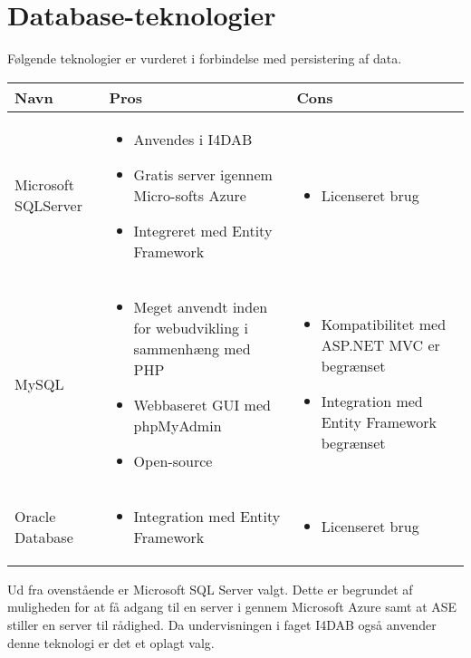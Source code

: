 \section{Database-teknologier}

Følgende teknologier er vurderet i forbindelse med persistering af data.

\begin{savenotes}
\begin{tabular}{|p{3cm}|p{5.5cm}|p{5.5cm}|}
\hline 
\textbf{Navn} & \textbf{Pros} & \textbf{Cons} \\ 
\hline

Microsoft SQL\newline Server
	&
	\begin{itemize}
		\item Anvendes i I4DAB
		\item Gratis server igennem Micro-softs Azure \citep{msazureWeb}
		\item Integreret med Entity Framework
	\end{itemize}
	&
	\begin{itemize}
		\item Licenseret brug
	\end{itemize}
	\\
	\hline

MySQL
	&
	\begin{itemize}
		\item Meget anvendt inden for webudvikling i sammenhæng med PHP
		\item Webbaseret GUI med phpMyAdmin \citep{phpMyAdminWeb}
		\item Open-source
	\end{itemize}
	&
	\begin{itemize}
		\item Kompatibilitet med ASP.NET MVC er begrænset
		\item Integration med Entity Framework begrænset
	\end{itemize}
	\\
	\hline

Oracle Database
	&
	\begin{itemize}
		\item Integration med Entity Framework
	\end{itemize}
	&
	\begin{itemize}
	\item Licenseret brug
	\end{itemize}
	\\
	\hline
\end{tabular}
\end{savenotes} 

Ud fra ovenstående er Microsoft SQL Server valgt. Dette er begrundet af muligheden for at få adgang til en server i gennem Microsoft Azure \citep{msazureWeb} samt at ASE stiller en server til rådighed. Da undervisningen i faget I4DAB også anvender denne teknologi er det et oplagt valg.